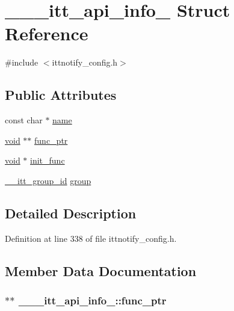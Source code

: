 \hypertarget{struct______itt__api__info__20101001}{\section{\-\_\-\-\_\-\-\_\-itt\-\_\-api\-\_\-info\-\_ Struct Reference}
\label{struct______itt__api__info__20101001}
}


{\ttfamily \#include $<$ittnotify\-\_\-config.\-h$>$}

\subsection*{Public Attributes}
\begin{DoxyCompactItemize}
\item 
const char $\ast$ \hyperlink{struct______itt__api__info__20101001_a8e9d10c3041b72e1ea0355b40ee772a5}{name}
\item 
\hyperlink{ittnotify__static_8h_af941d56e55e3c5465135b60c4d6343ed}{void} $\ast$$\ast$ \hyperlink{struct______itt__api__info__20101001_a3055f1f3a553efe6059d674987e0b2e8}{func\-\_\-ptr}
\item 
\hyperlink{ittnotify__static_8h_af941d56e55e3c5465135b60c4d6343ed}{void} $\ast$ \hyperlink{struct______itt__api__info__20101001_a2c2825ddd464d578ab867e86f83da253}{init\-\_\-func}
\item 
\hyperlink{ittnotify__types_8h_ab43d42e38047ed421321091868ff992b}{\-\_\-\-\_\-itt\-\_\-group\-\_\-id} \hyperlink{struct______itt__api__info__20101001_abd973a098fd9181d23e93fcb2a3de469}{group}
\end{DoxyCompactItemize}


\subsection{Detailed Description}


Definition at line 338 of file ittnotify\-\_\-config.\-h.



\subsection{Member Data Documentation}
\hypertarget{struct______itt__api__info__20101001_a3055f1f3a553efe6059d674987e0b2e8}{
\subsubsection[{func\-\_\-ptr}]{$\ast$$\ast$ \-\_\-\-\_\-\-\_\-itt\-\_\-api\-\_\-info\-\_\-::func\-\_\-ptr}}\label{struct______itt__api__info__20101001_a3055f1f3a553efe6059d674987e0b2e8}


